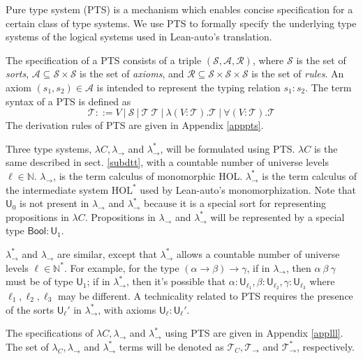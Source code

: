   Pure type system (PTS) \cite{LambdaWithType} is a mechanism which enables concise specification
  for a certain class of type systems. We use PTS to formally specify the underlying type systems
  of the logical systems used in Lean-auto's translation.

  The specification of a PTS consists of a triple $(\mathcal{S}, \mathcal{A}, \mathcal{R})$,
  where $\mathcal{S}$ is the set of \textit{sorts}, $\mathcal{A} \subseteq \mathcal{S} \times \mathcal{S}$ is
  the set of \textit{axioms}, and $\mathcal{R} \subseteq \mathcal{S} \times \mathcal{S} \times \mathcal{S}$
  is the set of \textit{rules}. An axiom $(s_1, s_2) \in \mathcal{A}$ is intended to represent
  the typing relation $s_1 : s_2$. The term syntax of a PTS is defined as
  $$\mathcal{T} ::= V \ | \ \mathcal{S} \ | \ \mathcal{T} \ \mathcal{T} \ |
    \ \lambda (V : \mathcal{T}). \mathcal{T} \ | \ \forall (V : \mathcal{T}). \mathcal{T}$$
  \noindent The derivation rules of PTS are given in Appendix \ref{apppts}.

  Three type systems, $\lambda C, \lambda_\to$ and $\lambda_\to^*$, will be formulated
  using PTS. $\lambda C$ is the same described in sect. \ref{subdtt}, with
  a countable number of universe levels $\ell \in \mathbb{N}$. $\lambda_\to$,
  is the term calculus of monomorphic HOL. $\lambda_\to^*$ is the term
  calculus of the intermediate system $\text{HOL}^*$ used by Lean-auto's
  monomorphization. Note that $\mathsf{U}_0$ is not present in $\lambda_\to$ and $\lambda_\to^*$
  because it is a special sort for representing propositions in $\lambda C$.
  Propositions in $\lambda_\to$ and $\lambda_\to^*$ will be represented by
  a special type $\mathsf{Bool} : \mathsf{U}_1$.
  
  $\lambda_\to^*$ and $\lambda_\to$ are similar, except that $\lambda_\to^*$ allows a
  countable number of universe levels $\ell \in \mathbb{N}^*$. For example,
  for the type $(\alpha \to \beta) \to \gamma$, if in $\lambda_\to$,
  then $\alpha \ \beta \ \gamma$ must be of type $\mathsf{U}_1$; if in
  $\lambda_\to^*$, then it's possible that $\alpha : \mathsf{U}_{\ell_1},
  \beta : \mathsf{U}_{\ell_2}, \gamma : \mathsf{U}_{\ell_3}$ where $\ell_1, \ell_2, \ell_3$
  may be different. A technicality related to PTS requires the presence of
  the sorts $\mathsf{U}_\ell'$ in $\lambda_\to^*$, with axioms $\mathsf{U}_\ell : \mathsf{U}_\ell'$.

  The specifications of $\lambda C, \lambda_\to$ and $\lambda_\to^*$ using PTS are given in
  Appendix \ref{applll}. The set of $\lambda_C, \lambda_\to$ and $\lambda_\to^*$ terms will be
  denoted as $\mathcal{T}_C, \mathcal{T}_\to$ and $\mathcal{T}_\to^*$, respectively.